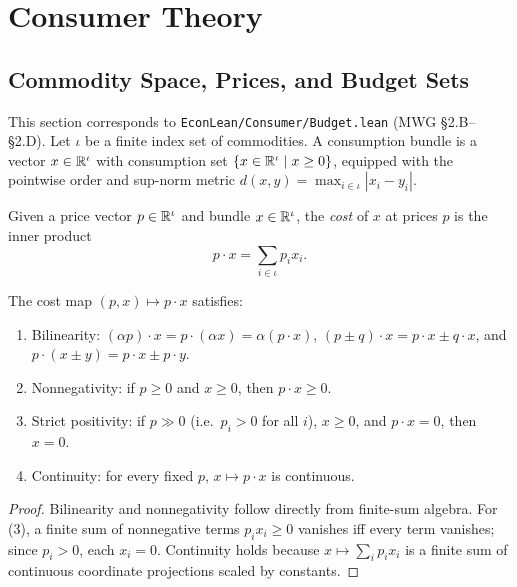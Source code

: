 \chapter{Consumer Theory}
\label{chap:consumer}

\section{Commodity Space, Prices, and Budget Sets}
\label{sec:budget}

This section corresponds to \texttt{EconLean/Consumer/Budget.lean} (MWG \S2.B--\S2.D).
Let $\iota$ be a finite index set of commodities. A consumption bundle is a vector
$x \in \mathbb{R}^\iota$ with consumption set $\{x \in \mathbb{R}^\iota \mid x \ge 0\}$, equipped with
the pointwise order and sup-norm metric $d(x, y) = \max_{i \in \iota} |x_i - y_i|$.

\begin{definition}
\label{def:cost}
\leanok
Given a price vector $p \in \mathbb{R}^\iota$ and bundle $x \in \mathbb{R}^\iota$, the \emph{cost} of
$x$ at prices $p$ is the inner product
\[
  p \cdot x = \sum_{i \in \iota} p_i x_i.
\]
\end{definition}

\begin{lemma}
\label{lem:cost_props}
\leanok
{}
The cost map $(p, x) \mapsto p \cdot x$ satisfies:
\begin{enumerate}
  \item Bilinearity: $(\alpha p) \cdot x = p \cdot (\alpha x) = \alpha(p \cdot x)$,
        $(p \pm q) \cdot x = p \cdot x \pm q \cdot x$, and $p \cdot (x \pm y) = p \cdot x \pm p \cdot y$.
  \item Nonnegativity: if $p \ge 0$ and $x \ge 0$, then $p \cdot x \ge 0$.
  \item Strict positivity: if $p \gg 0$ (i.e.\ $p_i > 0$ for all $i$), $x \ge 0$, and
        $p \cdot x = 0$, then $x = 0$.
  \item Continuity: for every fixed $p$, $x \mapsto p \cdot x$ is continuous.
\end{enumerate}
\end{lemma}
\begin{proof}
\leanok
Bilinearity and nonnegativity follow directly from finite-sum algebra. For (3), a finite
sum of nonnegative terms $p_i x_i \ge 0$ vanishes iff every term vanishes; since $p_i > 0$,
each $x_i = 0$. Continuity holds because $x \mapsto \sum_i p_i x_i$ is a finite sum of
continuous coordinate projections scaled by constants.
\end{proof}

